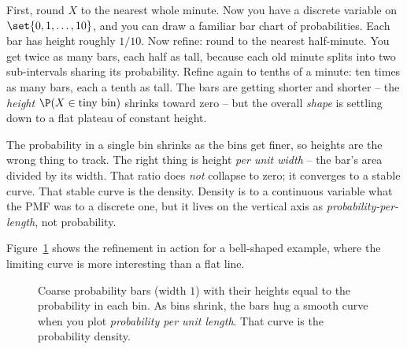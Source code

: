 First, round $X$ to the nearest whole minute. Now you have a discrete variable on
$\set{0,1,\dots,10}$, and you can draw a familiar bar chart of probabilities. Each
bar has height roughly $1/10$. Now refine: round to the nearest half-minute. You
get twice as many bars, each half as tall, because each old minute splits into two
sub-intervals sharing its probability. Refine again to tenths of a minute: ten
times as many bars, each a tenth as tall. The bars are getting shorter and shorter
-- the \emph{height} $\P(X \in \text{tiny bin})$ shrinks toward zero -- but the
overall \emph{shape} is settling down to a flat plateau of constant height.

\begin{intuitionbox}
The probability in a single bin shrinks as the bins get finer, so heights are the
wrong thing to track. The right thing is height \emph{per unit width} -- the bar's
area divided by its width. That ratio does \emph{not} collapse to zero; it
converges to a stable curve. That stable curve is the density. Density is to a
continuous variable what the PMF was to a discrete one, but it lives on the
vertical axis as \emph{probability-per-length}, not probability.
\end{intuitionbox}

Figure~\ref{ch10:fig-refine} shows the refinement in action for a bell-shaped
example, where the limiting curve is more interesting than a flat line.

\begin{figure}[H]
\centering
{}
\caption{Coarse probability bars (width $1$) with their heights equal to the
probability in each bin. As bins shrink, the bars hug a smooth curve when you plot
\emph{probability per unit length}. That curve is the probability density.}
\label{ch10:fig-refine}
\end{figure}

